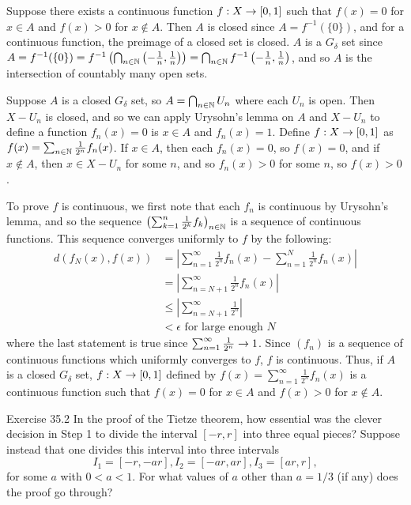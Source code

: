 \documentclass{hmwk}
\begin{document}
\begin{solution}


\pre Suppose there exists a continuous function $f: X \rightarrow [0, 1]$ such that $f(x) = 0$ for $x \in A$ and $f(x) > 0$ for $x \notin A$. Then $A$ is closed since $A = f^{-1}(\{0\})$, and for a continuous function, the preimage of a closed set is closed. $A$ is a $G_\delta$ set since $A = f^{-1}(\{0\}) = f^{-1}\left(\bigcap_{n \in \mathbb{N}}\left(-\frac{1}{n}, \frac{1}{n}\right)\right) = \bigcap_{n \in \mathbb{N}}f^{-1}\left(-\frac{1}{n}, \frac{1}{n}\right)$, and so $A$ is the intersection of countably many open sets. 

\pre Suppose $A$ is a closed $G_\delta$ set, so $A = \bigcap_{n \in \mathbb{N}} U_n$ where each $U_n$ is open. Then $X - U_n$ is closed, and so we can apply Urysohn's lemma on $A$ and $X - U_n$ to define a function $f_n(x) = 0$ is $x \in A$ and $f_n(x) = 1$. Define $f: X \rightarrow [0, 1]$ as $f(x) = \sum_{n\in\mathbb{N}} \frac{1}{2^n}f_n(x)$. If $x \in A$, then each $f_n(x) = 0$, so $f(x) = 0$, and if $x \notin A$, then $x \in X - U_n$ for some $n$, and so $f_n(x) > 0$ for some $n$, so $f(x) > 0$. 

\pre To prove $f$ is continuous, we first note that each $f_n$ is continuous by Urysohn's lemma, and so the sequence $\left(\sum_{k=1}^n \frac{1}{2^k}f_k\right)_{n \in \mathbb{N}}$ is a sequence of continuous functions. This sequence converges uniformly to $f$ by the following:
\begin{align*}
    d(f_N(x), f(x)) &= \left|\sum_{n=1}^\infty \frac{1}{2^n}f_n(x) - \sum_{n=1}^N \frac{1}{2^n}f_n(x)\right| \\
    &= \left|\sum_{n=N+1}^\infty \frac{1}{2^n}f_n(x)\right| \\
    &\leq \left|\sum_{n=N+1}^\infty \frac{1}{2^n}\right| \\
    &< \epsilon \text{ for large enough $N$}
\end{align*}
where the last statement is true since $\sum_{n=1}^\infty \frac{1}{2^n} \rightarrow 1$. Since $(f_n)$ is a sequence of continuous functions which uniformly converges to $f$, $f$ is continuous. Thus, if $A$ is a closed $G_\delta$ set, $f: X \rightarrow [0, 1]$ defined by $f(x) = \sum_{n=1}^\infty \frac{1}{2^n}f_n(x)$ is a continuous function such that $f(x) = 0$ for $x \in A$ and $f(x) > 0$ for $x \notin A$.
\end{solution}

\begin{problem}{Exercise 35.2}
In the proof of the Tietze theorem, how essential was the clever decision in Step 1 to divide the interval $[-r, r]$ into three equal pieces? Suppose instead that one divides this interval into three intervals 
$$I_1 = [-r, -ar], I_2 = [-ar, ar], I_3 = [ar, r],$$
for some $a$ with $0 < a < 1$. For what values of $a$ other than $a = 1/3$ (if any) does the proof go through? 
\end{problem}
\end{document}
